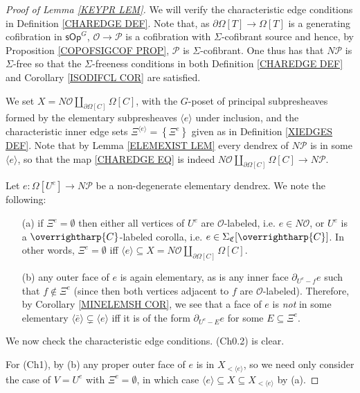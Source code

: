 \documentclass[a4paper,10pt]{article}%
\numberwithin{equation}{section}
\numberwithin{figure}{section}
\theoremstyle{definition} %
\newcommand{\vect}[1]{\text{\overrightharp{\ensuremath{#1}}}}
\newcommand{\sOp}{\ensuremath{\mathsf{sOp}}}%
\renewcommand{\O}{\ensuremath{\mathcal O}}
\renewcommand{\P}{\ensuremath{\mathcal P}}
\newcommand{\1}{\ensuremath{\mathbbm 1}}%
\begin{document}
\begin{proof}[Proof of Lemma \ref{KEYPR LEM}]
	We will verify the characteristic edge conditions in Definition \ref{CHAREDGE DEF}.
%
	Note that, 
	as $\partial \Omega[T] \to \Omega[T]$ is a generating cofibration in $\sOp^G$,
	$\O \to \P$ is a cofibration with $\Sigma$-cofibrant source and hence, by Proposition \ref{COPOFSIGCOF PROP},
	$\P$ is $\Sigma$-cofibrant.
	One thus has that 
	$N \mathcal{P}$ is $\Sigma$-free so that 
	the $\Sigma$-freeness conditions in 
	both Definition \ref{CHAREDGE DEF}
	and Corollary \ref{ISODIFCL COR}
	are satisfied.

	We set $X = N \mathcal{O} \amalg_{\partial \Omega[C]} \Omega[C]$, 
	with the $G$-poset of principal subpresheaves formed by the 
	elementary subpresheaves 
	$\langle e \rangle$
	under inclusion, and the characteristic inner edge sets
	$\Xi^{\langle e \rangle} = \left\{\Xi^{e}\right\}$ given as in Definition \ref{XIEDGES DEF}.
	Note that by Lemma \ref{ELEMEXIST LEM}
	every dendrex of $N \mathcal{P}$ is in some 
	$\langle e \rangle$, so that the map
	\eqref{CHAREDGE EQ} is indeed
	$N \mathcal{O} \amalg_{\partial \Omega[C]} \Omega[C]
	\to N \mathcal{P}$.
	
	Let $e\colon \Omega[U^e] \to N \mathcal{P}$
	be a non-degenerate elementary dendrex. We note the following: 
	\begin{itemize}
		\item[(a)] if $\Xi^e = \emptyset$ then 
		either all vertices of $U^e$ are $\O$-labeled, i.e. $e \in N \mathcal{O}$, 
		or $U^e$ is a $\vect{C}$-labeled corolla, 
		i.e. $e \in \Sigma_{\mathfrak{C}}[\vect{C}]$.
		In other words, $\Xi^e = \emptyset$ iff 
		$\langle e \rangle \subseteq X = N \mathcal{O} \amalg_{\partial \Omega[C]} \Omega[C]$.
		\item[(b)] any outer face of $e$ is again elementary,
		as is any inner face $\partial_{U^e-f} e$ such that $f \not \in \Xi^e$
		(since then both vertices adjacent to $f$ are $\O$-labeled).
		Therefore, by Corollary \ref{MINELEMSH COR},
		we see that a face of $e$ is \emph{not} in
		some elementary $\langle \bar{e} \rangle \subsetneq \langle e \rangle$
		iff it is of the form
		$\partial_{U^e - E} e$
		for some $E \subseteq \Xi^e$.
	\end{itemize}

	We now check the characteristic edge conditions. (Ch0.2) is clear.
	
	For (Ch1), by (b) any proper outer face of $e$ is in $X_{<\langle e\rangle}$, so we need only consider the case of
	$V=U^e$ with $\Xi^e=\emptyset$, in which case
	$\langle e \rangle \subseteq X \subseteq X_{<\langle e\rangle}$ by (a).
	

\end{proof}
\end{document}
